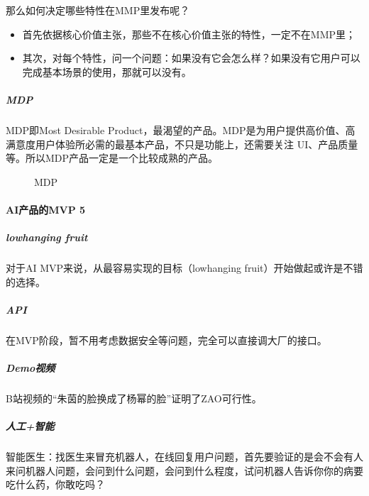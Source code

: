 \documentclass[letterpaper,10pt,english]{sphinxmanual}
\begin{document}
那么如何决定哪些特性在MMP里发布呢？
\begin{itemize}
\item {} 
首先依据核心价值主张，那些不在核心价值主张的特性，一定不在MMP里；

\item {} 
其次，对每个特性，问一个问题：如果没有它会怎么样？如果没有它用户可以完成基本场景的使用，那就可以没有。

\end{itemize}


\subparagraph{MDP}
\label{\detokenize{chapter_knowledge/MVP:mdp}}
MDP即Most Desirable
Product，最渴望的产品。MDP是为用户提供高价值、高满意度用户体验所必需的最基本产品，不只是功能上，还需要关注
UI、产品质量等。所以MDP产品一定是一个比较成熟的产品。

\begin{figure}[H]
\centering
\capstart

\noindent{}
\caption{MDP}\label{\detokenize{chapter_knowledge/MVP:id11}}\end{figure}


\paragraph{AI产品的MVP 5\sphinxfootnotemark[640]}
\label{\detokenize{chapter_knowledge/MVP:aimvp-5}}%
\begin{footnotetext}[640]\sphinxAtStartFootnote
{}
%
\end{footnotetext}\ignorespaces 

\subparagraph{low\sphinxhyphen{}hanging fruit}
\label{\detokenize{chapter_knowledge/MVP:low-hanging-fruit}}
对于AI MVP来说，从最容易实现的目标（low\sphinxhyphen{}hanging
fruit）开始做起或许是不错的选择。%
\begin{footnote}[641]\sphinxAtStartFootnote
{}
%
\end{footnote}


\subparagraph{API}
\label{\detokenize{chapter_knowledge/MVP:api}}
在MVP阶段，暂不用考虑数据安全等问题，完全可以直接调大厂的接口。


\subparagraph{Demo视频}
\label{\detokenize{chapter_knowledge/MVP:demo}}
B站视频的“朱茵的脸换成了杨幂的脸”证明了ZAO可行性。


\subparagraph{人工+智能}
\label{\detokenize{chapter_knowledge/MVP:id8}}
智能医生：找医生来冒充机器人，在线回复用户问题，首先要验证的是会不会有人来问机器人问题，会问到什么问题，会问到什么程度，试问机器人告诉你你的病要吃什么药，你敢吃吗？
\end{document}
